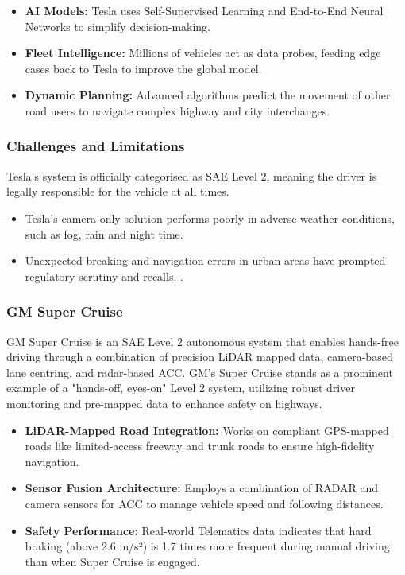 \documentclass[12pt, a4paper]{report}
\begin{document}
\begin{itemize}
    \item \textbf{AI Models:} Tesla uses Self-Supervised Learning and End-to-End Neural Networks to simplify decision-making.
    \item \textbf{Fleet Intelligence:} Millions of vehicles act as data probes, feeding edge cases back to Tesla to improve the global model.
    \item \textbf{Dynamic Planning:} Advanced algorithms predict the movement of other road users to navigate complex highway and city interchanges.
\end{itemize}

\subsubsection{Challenges and Limitations}
Tesla’s system is officially categorised as SAE Level 2, meaning the driver is legally responsible for the vehicle at all times.

\begin{itemize}
    \item Tesla’s camera-only solution performs poorly in adverse weather conditions, such as fog, rain and night time.
    \item Unexpected breaking and navigation errors in urban areas have prompted regulatory scrutiny and recalls. \cite{ref6,ref7}.
\end{itemize}

\subsubsection{GM Super Cruise}

GM Super Cruise is an \ac{SAE} Level 2 autonomous system that enables hands-free driving through a combination of precision \ac{LiDAR} mapped data, camera-based lane centring, and radar-based \ac{ACC}. GM’s Super Cruise stands as a prominent example of a "hands-off, eyes-on" Level 2 system, utilizing robust driver monitoring and pre-mapped data to enhance safety on highways.

\begin{itemize}
    \item \textbf{\ac{LiDAR}-Mapped Road Integration:} Works on compliant \ac{GPS}-mapped roads like limited-access freeway and trunk roads  to ensure high-fidelity navigation.
    \item \textbf{Sensor Fusion Architecture:}  Employs a combination of \ac{RADAR} and camera sensors for \ac{ACC} to manage vehicle speed and following distances.
    \item \textbf{Safety Performance:} Real-world Telematics data indicates that hard braking (above 2.6 m/s²) is 1.7 times more frequent during manual driving than when Super Cruise is engaged.

\end{itemize}
\end{document}
